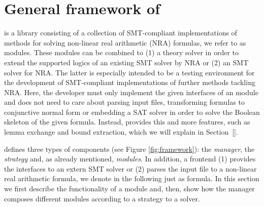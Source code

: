 \chapter{General framework of \smtrat}
\label{chapter:generalframework}
\smtrat is a \Cpp library consisting of a collection of
SMT-compliant implementations of methods for solving non-linear real
arithmetic (NRA) formulas, we refer to as modules. These modules can be 
combined to (1) a theory solver in order to extend the supported logics of an
existing SMT solver by NRA or (2) an SMT solver for NRA. The latter is 
especially intended to be a testing environment for the development 
of SMT-compliant implementations of further methods tackling NRA. Here,
the developer must only implement the given interfaces of an \smtrat 
module and does not need to care about parsing input files, transforming
formulas to conjunctive normal form or embedding a SAT solver in order
to solve the Boolean skeleton of the given formula. Instead, \smtrat
provides this and more features, such as lemma exchange and bound
extraction, which we will explain in Section~\ref{}.

\smtrat defines three types of components (see Figure 
\ref{fig:framework}): the \emph{manager}, the \emph{strategy} and, as already mentioned, \emph{modules}. 
In addition, a frontend (1) provides the interfaces to an extern SMT 
solver or (2) parses the input file to a non-linear real arithmetic 
formula, we denote in the following just as formula.
In this section we first describe the functionality of a module and,
then, show how the manager composes different modules according to a
strategy to a solver.

